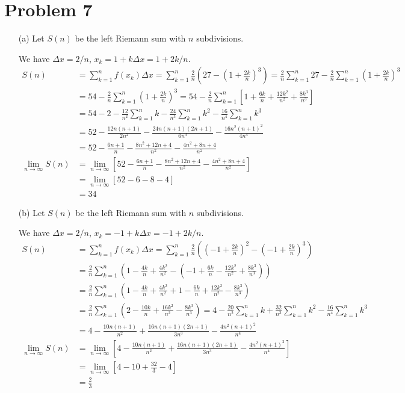 \documentclass[preview, margin=0.6in]{standalone}
\newcommand*{\problem}[1]{\section*{Problem #1}}
\begin{document}
\problem{7}
\begin{itemize}
	\item[(a)]
		Let $S(n)$ be the left Riemann sum with $n$ subdivisions.

		We have $\Delta x=2/n$, $x_k=1+k\Delta x=1+2k/n$.
		\begin{align*}
			S(n)&=\sum_{k=1}^{n}f(x_k)\Delta x
			=\sum_{k=1}^{n}\frac2n\left(27-\left(1+\frac{2k}{n}\right)^3\right)
			=\frac2n\sum_{k=1}^{n}27-\frac2n\sum_{k=1}^{n}\left(1+\frac{2k}{n}\right)^3 \\
			&=54-\frac2n\sum_{k=1}^{n}\left(1+\frac{2k}{n}\right)^3
			=54-\frac2n\sum_{k=1}^{n}\left[1+\frac{6k}{n}+\frac{12k^2}{n^2}+\frac{8k^3}{n^3}\right] \\
			&=54-2-\frac{12}{n^2}\sum_{k=1}^{n}k-\frac{24}{n^3}\sum_{k=1}^{n}k^2-\frac{16}{n^4}\sum_{k=1}^{n}k^3 \\
			&=52-\frac{12n(n+1)}{2n^2}-\frac{24n(n+1)(2n+1)}{6n^3}-\frac{16n^2(n+1)^2}{4n^4}\\
			&=52-\frac{6n+1}{n}-\frac{8n^2+12n+4}{n^2}-\frac{4n^2+8n+4}{n^2} \\
			\lim_{n\to\infty}S(n)&=\lim_{n\to\infty}\left[52-\frac{6n+1}{n}-\frac{8n^2+12n+4}{n^2}-\frac{4n^2+8n+4}{n^2}\right] \\
			&=\lim_{n\to\infty}\left[52-6-8-4\right]
			\tag{Trivial and left as exercise to the reader.} \\
			&=\boxed{34}
		\end{align*}
	\item[(b)]
		Let $S(n)$ be the left Riemann sum with $n$ subdivisions.

		We have $\Delta x=2/n$, $x_k=-1+k\Delta x=-1+2k/n$.
		\begin{align*}
			S(n)&=\sum_{k=1}^{n}f(x_k)\Delta x
			=\sum_{k=1}^{n}\frac2n\left(\left(-1+\frac{2k}{n}\right)^2-\left(-1+\frac{2k}{n}\right)^3\right) \\
			&=\frac2n\sum_{k=1}^{n}\left(1-\frac{4k}{n}+\frac{4k^2}{n^2}-\left(-1+\frac{6k}{n}-\frac{12k^2}{n^2}+\frac{8k^3}{n^3}\right)\right) \\
			&=\frac2n\sum_{k=1}^{n}\left(1-\frac{4k}{n}+\frac{4k^2}{n^2}+1-\frac{6k}{n}+\frac{12k^2}{n^2}-\frac{8k^3}{n^3}\right) \\
			&=\frac2n\sum_{k=1}^{n}\left(2-\frac{10k}{n}+\frac{16k^2}{n^2}-\frac{8k^3}{n^3}\right)
			=4-\frac{20}{n^2}\sum_{k=1}^{n}k+\frac{32}{n^3}\sum_{k=1}^{n}k^2-\frac{16}{n^4}\sum_{k=1}^{n}k^3 \\
			&=4-\frac{10n(n+1)}{n^2}+\frac{16n(n+1)(2n+1)}{3n^3}-\frac{4n^2(n+1)^2}{n^4} \\
			\lim_{n\to\infty}S(n)&=\lim_{n\to\infty}\left[4-\frac{10n(n+1)}{n^2}+\frac{16n(n+1)(2n+1)}{3n^3}-\frac{4n^2(n+1)^2}{n^4}\right] \\
			 &=\lim_{n\to\infty}\left[4-10+\frac{32}{3}-4\right] \tag{This statement does not warrant a proof.} \\ 
			 &=\boxed{\frac23}
		\end{align*}
\end{itemize}
\end{document}
